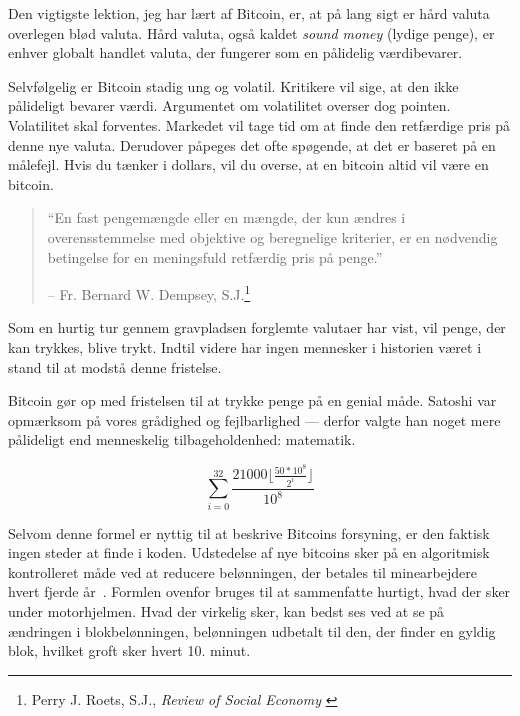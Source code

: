 Den vigtigste lektion, jeg har lært af Bitcoin, er, at på lang sigt er hård valuta overlegen blød valuta. Hård valuta, også kaldet \textit{sound money} (lydige penge), er enhver globalt handlet valuta, der fungerer som en pålidelig værdibevarer.

Selvfølgelig er Bitcoin stadig ung og volatil. Kritikere vil sige, at den ikke pålideligt bevarer værdi. Argumentet om volatilitet overser dog pointen. Volatilitet skal forventes. Markedet vil tage tid om at finde den retfærdige pris på denne nye valuta. Derudover påpeges det ofte spøgende, at det er baseret på en målefejl. Hvis du tænker i dollars, vil du overse, at en bitcoin altid vil være en bitcoin.

\begin{quotation}\begin{samepage}
\enquote{En fast pengemængde eller en mængde, der kun ændres i overensstemmelse med
objektive og beregnelige kriterier, er en nødvendig betingelse for en
meningsfuld retfærdig pris på penge.}
\begin{flushright} -- Fr. Bernard W. Dempsey, S.J.\footnote{Perry J. Roets, S.J., \textit{Review of Social Economy} \cite{review-social-economy}}
\end{flushright}\end{samepage}\end{quotation}

\newpage

Som en hurtig tur gennem gravpladsen forglemte valutaer har vist,
vil penge, der kan trykkes, blive trykt. Indtil videre har ingen mennesker i
historien været i stand til at modstå denne fristelse.

Bitcoin gør op med fristelsen til at trykke penge på en genial
måde. Satoshi var opmærksom på vores grådighed og fejlbarlighed --- derfor valgte han
noget mere pålideligt end menneskelig tilbageholdenhed: matematik.

\begin{center}
  \centering
  \begin{equation}
  \sum\limits_{i=0}^{32} \frac{21000 \lfloor \frac{50*10^8}{2^i} \rfloor}{10^8}
  \end{equation}
  \label{fig:supply-formula-white}
\end{center}

Selvom denne formel er nyttig til at beskrive Bitcoins forsyning, er den faktisk
ingen steder at finde i koden. Udstedelse af nye bitcoins sker på en
algoritmisk kontrolleret måde ved at reducere belønningen, der betales til
minearbejdere hvert fjerde år~\cite{btcwiki:supply}. Formlen ovenfor bruges til at
sammenfatte hurtigt, hvad der sker under motorhjelmen. Hvad der virkelig sker, kan bedst
ses ved at se på ændringen i blokbelønningen, belønningen udbetalt til den, der
finder en gyldig blok, hvilket groft sker hvert 10. minut.

